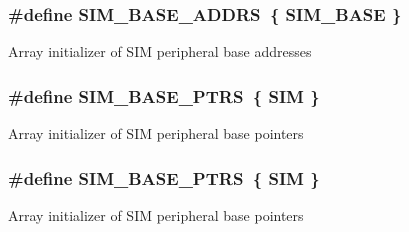 \subsubsection[{\texorpdfstring{S\+I\+M\+\_\+\+B\+A\+S\+E\+\_\+\+A\+D\+D\+RS}{SIM_BASE_ADDRS}}]{\setlength{\rightskip}{0pt plus 5cm}\#define S\+I\+M\+\_\+\+B\+A\+S\+E\+\_\+\+A\+D\+D\+RS~\{ {\bf S\+I\+M\+\_\+\+B\+A\+SE} \}}\hypertarget{group__SIM__Peripheral__Access__Layer_gad0dfdd9f125421e6e0387da3fce02a5d}{}\label{group__SIM__Peripheral__Access__Layer_gad0dfdd9f125421e6e0387da3fce02a5d}
Array initializer of S\+IM peripheral base addresses 
\subsubsection[{\texorpdfstring{S\+I\+M\+\_\+\+B\+A\+S\+E\+\_\+\+P\+T\+RS}{SIM_BASE_PTRS}}]{\setlength{\rightskip}{0pt plus 5cm}\#define S\+I\+M\+\_\+\+B\+A\+S\+E\+\_\+\+P\+T\+RS~\{ {\bf S\+IM} \}}\hypertarget{group__SIM__Peripheral__Access__Layer_ga2fd213a3b9fc7d761ab0cdeb74c34f91}{}\label{group__SIM__Peripheral__Access__Layer_ga2fd213a3b9fc7d761ab0cdeb74c34f91}
Array initializer of S\+IM peripheral base pointers 
\subsubsection[{\texorpdfstring{S\+I\+M\+\_\+\+B\+A\+S\+E\+\_\+\+P\+T\+RS}{SIM_BASE_PTRS}}]{\setlength{\rightskip}{0pt plus 5cm}\#define S\+I\+M\+\_\+\+B\+A\+S\+E\+\_\+\+P\+T\+RS~\{ {\bf S\+IM} \}}\hypertarget{group__SIM__Peripheral__Access__Layer_ga2fd213a3b9fc7d761ab0cdeb74c34f91}{}\label{group__SIM__Peripheral__Access__Layer_ga2fd213a3b9fc7d761ab0cdeb74c34f91}
Array initializer of S\+IM peripheral base pointers 